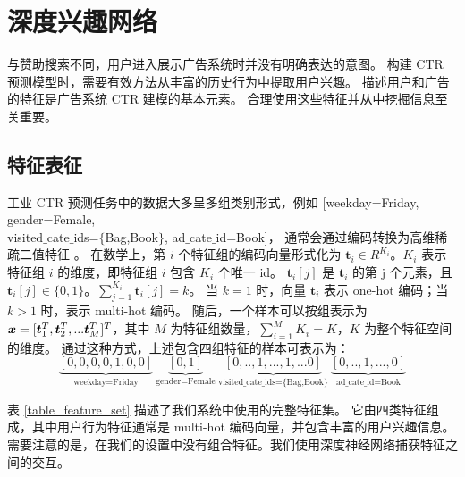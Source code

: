 \section{深度兴趣网络}\label{sec:opa}

与赞助搜索不同，用户进入展示广告系统时并没有明确表达的意图。
构建 CTR 预测模型时，需要有效方法从丰富的历史行为中提取用户兴趣。
描述用户和广告的特征是广告系统 CTR 建模的基本元素。
合理使用这些特征并从中挖掘信息至关重要。

\subsection{特征表征}
工业 CTR 预测任务中的数据大多呈多组类别形式，例如 [weekday=Friday, gender=Female, \\ visited$\_$cate$\_$ids=$\{$Bag,Book$\}$, ad$\_$cate$\_$id=Book]，
通常会通过编码转换为高维稀疏二值特征 \cite{deep_crossing,widedeep,ftrl}。
在数学上，第 $i$ 个特征组的编码向量形式化为 $\textbf{t}_i \in R^{K_i}$。$K_i$ 表示特征组 $i$ 的维度，即特征组 $i$ 包含 $K_i$ 个唯一 id。
$\textbf{t}_i[j]$ 是 $\textbf{t}_i$ 的第 j 个元素，且 $\textbf{t}_i[j] \in \{0,1\}$。$\sum_{j=1}^{K_i} \textbf{t}_i[j]=k$。
当 $k=1$ 时，向量 $\textbf{t}_i$ 表示 one-hot 编码；当 $k>1$ 时，表示 multi-hot 编码。
随后，一个样本可以按组表示为 $\boldsymbol{x} = [\boldsymbol{t}_1^T, \boldsymbol{t}_2^T,...\boldsymbol{t}_M^T]^T$，其中 $M$ 为特征组数量，$\sum_{i=1}^{M}K_i = K$，$K$ 为整个特征空间的维度。
通过这种方式，上述包含四组特征的样本可表示为：
\[
\underbrace{[0,0,0,0,1,0,0]}_{\text{weekday=Friday}} ~ \underbrace{[0,1]}_{\text{gender=Female}} ~ \underbrace{[0,..,1,...,1,...0]}_{\text{visited\_cate\_ids=\{Bag,Book\}}} 
~ \underbrace{[0,..,1,...,0]}_{\text{ad\_cate\_id=Book}}
\]

表 \ref{table_feature_set} 描述了我们系统中使用的完整特征集。
它由四类特征组成，其中用户行为特征通常是 multi-hot 编码向量，并包含丰富的用户兴趣信息。
需要注意的是，在我们的设置中没有组合特征。我们使用深度神经网络捕获特征之间的交互。

